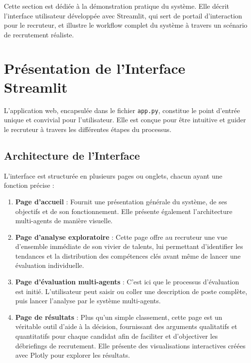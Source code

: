 \documentclass{rapportECL}
\begin{document}
Cette section est dédiée à la démonstration pratique du système. Elle décrit l'interface utilisateur développée avec Streamlit, qui sert de portail d'interaction pour le recruteur, et illustre le workflow complet du système à travers un scénario de recrutement réaliste.

\section{Présentation de l'Interface Streamlit}

L'application web, encapsulée dans le fichier \texttt{app.py}, constitue le point d'entrée unique et convivial pour l'utilisateur. Elle est conçue pour être intuitive et guider le recruteur à travers les différentes étapes du processus.

\subsection{Architecture de l'Interface}

L'interface est structurée en plusieurs pages ou onglets, chacun ayant une fonction précise :

\begin{enumerate}[leftmargin=*]
    \item \textbf{Page d'accueil} : Fournit une présentation générale du système, de ses objectifs et de son fonctionnement. Elle présente également l'architecture multi-agents de manière visuelle.
    
    \item \textbf{Page d'analyse exploratoire} : Cette page offre au recruteur une vue d'ensemble immédiate de son vivier de talents, lui permettant d'identifier les tendances et la distribution des compétences clés avant même de lancer une évaluation individuelle.
    
    \item \textbf{Page d'évaluation multi-agents} : C'est ici que le processus d'évaluation est initié. L'utilisateur peut saisir ou coller une description de poste complète, puis lancer l'analyse par le système multi-agents.
    
    \item \textbf{Page de résultats} : Plus qu'un simple classement, cette page est un véritable outil d'aide à la décision, fournissant des arguments qualitatifs et quantitatifs pour chaque candidat afin de faciliter et d'objectiver les débriefings de recrutement. Elle présente des visualisations interactives créées avec Plotly pour explorer les résultats.
\end{enumerate}
\end{document}
